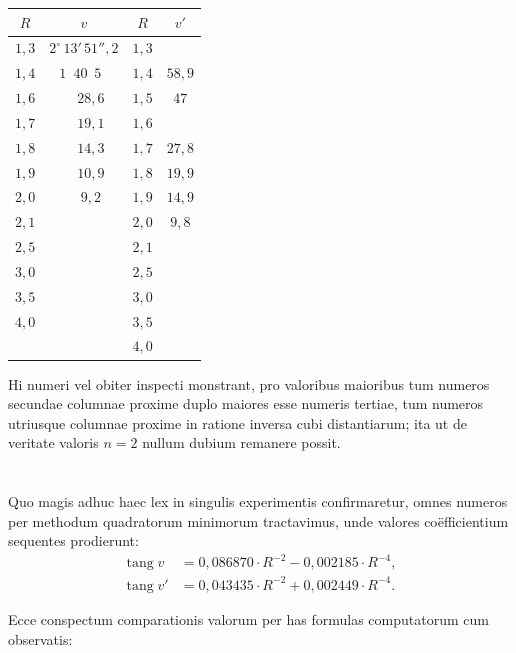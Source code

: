 \documentclass[fontsize=11pt,paper=a4,twoside,openany]{scrbook}
\DeclareMathOperator{\tang}{tang}
\begin{document}
\begin{center}
\small
\begin{tabular}{|c|c|c|c|}
\hline
$R$ & $v$ & $R$ & $v'$ \\
\hline
$1{,}3$ & $2^\circ\,13'\,51''{,}2$ & $1{,}3$ & \\
$1{,}4$ & $1\phantom{^\circ}\,40\phantom{'\,}5\phantom{''}$ & $1{,}4$ & $58{,}9$ \\
$1{,}6$ & $\phantom{0^\circ}\,28{,}6$ & $1{,}5$ & $47$ \\
$1{,}7$ & $\phantom{0^\circ}\,19{,}1$ & $1{,}6$ & \\
$1{,}8$ & $\phantom{0^\circ}\,14{,}3$ & $1{,}7$ & $27{,}8$ \\
$1{,}9$ & $\phantom{0^\circ}\,10{,}9$ & $1{,}8$ & $19{,}9$ \\
$2{,}0$ & $\phantom{0^\circ}\,9{,}2$ & $1{,}9$ & $14{,}9$ \\
$2{,}1$ & & $2{,}0$ & $9{,}8$ \\
$2{,}5$ & & $2{,}1$ & \\
$3{,}0$ & & $2{,}5$ & \\
$3{,}5$ & & $3{,}0$ & \\
$4{,}0$ & & $3{,}5$ & \\
& & $4{,}0$ & \\
\hline
\end{tabular}
\end{center}

Hi numeri vel obiter inspecti monstrant, pro valoribus maioribus tum numeros secundae columnae proxime duplo maiores esse numeris tertiae, tum numeros utriusque columnae proxime in ratione inversa cubi distantiarum; ita ut de veritate valoris $n=2$ nullum dubium remanere possit.

\section{}

Quo magis adhuc haec lex in singulis experimentis confirmaretur, omnes numeros per methodum quadratorum minimorum tractavimus, unde valores coëfficientium sequentes prodierunt:
\begin{align*}
\tang v &= 0{,}086870\cdot R^{-2} - 0{,}002185\cdot R^{-4},\\
\tang v' &= 0{,}043435\cdot R^{-2} + 0{,}002449\cdot R^{-4}.
\end{align*}

Ecce conspectum comparationis valorum per has formulas computatorum cum observatis:
\end{document}
